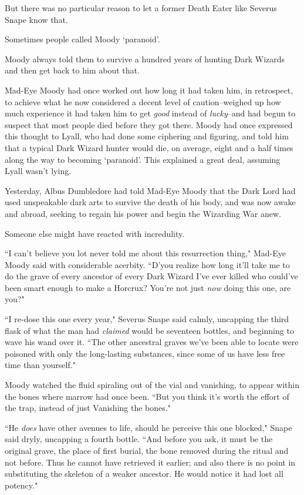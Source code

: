 But there was no particular reason to let a former Death Eater like Severus Snape know that.

Sometimes people called Moody `paranoid'.

Moody always told them to survive a hundred years of hunting Dark Wizards and then get back to him about that.

Mad-Eye Moody had once worked out how long it had taken him, in retrospect, to achieve what he now considered a decent level of caution\---weighed up how much experience it had taken him to get \emph{good} instead of \emph{lucky}\---and had begun to suspect that most people died before they got there. Moody had once expressed this thought to Lyall, who had done some ciphering and figuring, and told him that a typical Dark Wizard hunter would die, on average, eight and a half times along the way to becoming `paranoid'. This explained a great deal, assuming Lyall wasn't lying.

Yesterday, Albus Dumbledore had told Mad-Eye Moody that the Dark Lord had used unspeakable dark arts to survive the death of his body, and was now awake and abroad, seeking to regain his power and begin the Wizarding War anew.

Someone else might have reacted with incredulity.

``I can't believe you lot never told me about this resurrection thing," Mad-Eye Moody said with considerable acerbity. ``D'you realize how long it'll take me to do the grave of every ancestor of every Dark Wizard I've ever killed who could've been smart enough to make a Horcrux? You're not just \emph{now} doing this one, are you?"

``I re-dose this one every year," Severus Snape said calmly, uncapping the third flask of what the man had \emph{claimed} would be seventeen bottles, and beginning to wave his wand over it. ``The other ancestral graves we've been able to locate were poisoned with only the long-lasting substances, since some of us have less free time than yourself."

Moody watched the fluid spiraling out of the vial and vanishing, to appear within the bones where marrow had once been. ``But you think it's worth the effort of the trap, instead of just Vanishing the bones."

``He \emph{does} have other avenues to life, should he perceive this one blocked," Snape said dryly, uncapping a fourth bottle. ``And before you ask, it must be the original grave, the place of first burial, the bone removed during the ritual and not before. Thus he cannot have retrieved it earlier; and also there is no point in substituting the skeleton of a weaker ancestor. He would notice it had lost all potency."

